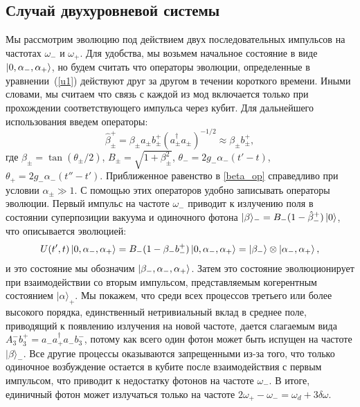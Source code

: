 \subsection{Случай двухуровневой системы}
Мы рассмотрим эволюцию под действием двух последовательных импульсов на частотах $\omega_-$ и $\omega_+$. Для удобства, мы возьмем начальное состояние в виде $\ket{0, \alpha_-, \alpha_+}$, но будем считать что операторы эволюции, определенные в уравнении~(\ref{u1}) действуют друг за другом в течении короткого времени. Иными словами, мы считаем что связь с каждой из мод включается только при прохождении соответствующего импульса через кубит. Для дальнейшего использования введем операторы:
\begin{equation}
\hat{\beta}^+_{\pm} = \beta_\pm a_\pm b^+_\pm (a^\dag_\pm a_\pm)^{-1/2}\approx \beta_{\pm}b^+_{\pm},
\label{beta_op}
\end{equation} 
где $\beta_\pm = \tan(\theta_\pm/2)$, $B_\pm = \sqrt{1+\beta_\pm^2}$, $\theta_- = 2g_- \alpha_- (t'-t)$, $\theta_+ = 2g_- \alpha_-(t''-t')$. Приближенное равенство в \eqref{beta_op} справедливо при условии $\alpha_{\pm} \gg 1$. С помощью этих операторов удобно записывать операторы эволюции. Первый импульс на частоте $\omega_-$ приводит к излучению поля в состоянии суперпозиции вакуума и одиночного фотона $|\beta\rangle_- = B_-(1-\hat{\beta}_-^+)\ket{0}$, что описывается эволюцией:
\begin{equation}
	U(t^\prime,t)\ket{0,\alpha_-,\alpha_+} =  B_- (1 - \beta_- b^+_-)\ket{0,\alpha_-,\alpha_+}=\ket{\beta_-}\otimes\ket{\alpha_-,\alpha_+},
\end{equation}
и это состояние мы обозначим $\ket{\beta_-,\alpha_-,\alpha_+}$. Затем это состояние эволюционирует при взаимодействии со вторым импульсом, представляемым когерентным состоянием $|\alpha\rangle_+$. Мы покажем, что среди всех процессов третьего или более высокого порядка, единственный нетривиальный вклад в среднее поле, приводящий к появлению излучения на новой частоте, дается слагаемым вида $A^-_{3} b^+_3 = a_- a^\dag_+ a_- b^-_3$, потому как всего один фотон может быть испущен на частоте $|\beta\rangle_-$. Все другие процессы оказываются запрещенными из-за того, что только одиночное возбуждение остается в кубите после взаимодействия с первым импульсом, что приводит к недостатку фотонов на частоте $\omega_-$. В итоге, единичный фотон может излучаться только на частоте $2\omega_+ - \omega_- = \omega_d + 3\delta\omega$. 

